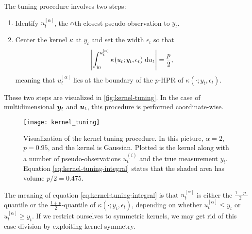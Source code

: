 The tuning procedure involves two steps:
\begin{enumerate}
    \item Identify $u_t^{[\alpha]}$, the $\alpha$th closest pseudo-observation to $y_t$.
    \item Center the kernel $\kappa$ at $y_t$ and set the width $\epsilon_t$ so that
    \begin{equation} \label{eq:kernel-tuning-integral}
    \left| \int_{y_t}^{u_t^{[\alpha]}} \kappa(u_t; y_t, \epsilon_t) \; \mathrm{d}{u_t} \right| = \frac{p}{2},
    \end{equation}
    meaning that $u_t^{[\alpha]}$ lies at the boundary of the $p$-HPR of $\kappa(\cdot; y_t, \epsilon_t)$.
\end{enumerate}
These two steps are visualized in \autoref{fig:kernel-tuning}. In the case of multidimensional $\bm{y}_t$ and $\bm{u}_t$, this procedure is performed coordinate-wise. 

\begin{figure}[ht]
    \centering
    \texttt{[image: kernel\_tuning]}
    \caption{Visualization of the kernel tuning procedure. In this picture, ${\alpha = 2}$, ${p = 0.95}$, and the kernel is Gaussian. Plotted is the kernel along with a number of pseudo-observations $u_t^{(i)}$ and the true measurement $y_t$. Equation \eqref{eq:kernel-tuning-integral} states that the shaded area has volume $p/2 = 0.475$.}
    \label{fig:kernel-tuning}
\end{figure}

The meaning of equation \eqref{eq:kernel-tuning-integral} is that $u_t^{[\alpha]}$ is either the $\frac{1-p}{2}$-quantile or the $\frac{1+p}{2}$-quantile of $\kappa(\cdot; y_t, \epsilon_t)$, depending on whether $u_t^{[\alpha]} \leq y_t$ or $u_t^{[\alpha]} \geq y_t$. If we restrict ourselves to symmetric kernels, we may get rid of this case division by exploiting kernel symmetry.

